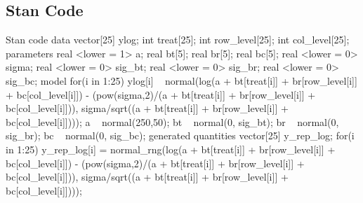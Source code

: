 \documentclass{article}
\begin{document}
\subsection{Stan Code}
\begin{sexylisting}{Stan code}
data{
  vector[25] ylog;
  int treat[25];
  int row_level[25];
  int col_level[25];
}
parameters{
  real <lower = 1> a;
  real bt[5];
  real br[5];
  real bc[5];
  real <lower = 0> sigma;
  real <lower = 0> sig_bt;
  real <lower = 0> sig_br;
  real <lower = 0> sig_bc;
}
model{
  for(i in 1:25){
    ylog[i] ~ normal(log(a + bt[treat[i]] 
                 + br[row_level[i]] 
                 + bc[col_level[i]]) - (pow(sigma,2)/(a + bt[treat[i]] 
                 + br[row_level[i]] 
                 + bc[col_level[i]])), sigma/sqrt((a + bt[treat[i]] 
                 + br[row_level[i]] 
                 + bc[col_level[i]])));
}
a ~ normal(250,50);
bt ~ normal(0, sig_bt);
br ~ normal(0, sig_br);
bc ~ normal(0, sig_bc);
}
generated quantities{
  vector[25] y_rep_log;
  for(i in 1:25){
    y_rep_log[i] = normal_rng(log(a + bt[treat[i]]
                 + br[row_level[i]] 
                 + bc[col_level[i]]) - (pow(sigma,2)/(a + bt[treat[i]] 
                 + br[row_level[i]] 
                 + bc[col_level[i]])), sigma/sqrt((a + bt[treat[i]] 
                 + br[row_level[i]] 
                 + bc[col_level[i]])));
  }
}
\end{sexylisting}
\end{document}
